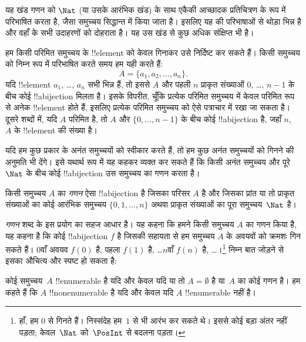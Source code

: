 \documentclass[../../../include/open-logic-section]{subfiles}
\begin{document}


\begin{editorial}
  यह खंड गणन को $\Nat$ (या उसके आरंभिक खंड) के साथ एकैकी आच्छादक
  प्रतिचित्रण के रूप में परिभाषित करता है, जैसा समुच्चय सिद्धान्त में किया
  जाता है। इसलिए यह  की परिभाषाओं से थोड़ा भिन्न है और वहाँ
  के सभी उदाहरणों को दोहराता है। यह उस खंड से कुछ अधिक संक्षिप्त भी है।
\end{editorial}

हम किसी परिमित समुच्चय के !!{element} को केवल गिनाकर उसे निर्दिष्ट कर सकते
हैं। किसी समुच्चय को निम्न रूप में परिभाषित करते समय हम यही करते हैं:
\[
  A = \{a_1, a_2, \ldots, a_n\}.
\]
यदि !!{element} $a_1$, \dots, $a_n$ सभी भिन्न हैं, तो इससे $A$ और पहली
$n$ प्राकृत संख्याओं $0$, \dots, $n-1$ के बीच कोई !!a{bijection} मिलता
है। इसके विपरीत, चूँकि प्रत्येक परिमित समुच्चय में केवल परिमित रूप से अनेक
!!{element} होते हैं, इसलिए प्रत्येक परिमित समुच्चय को ऐसे पत्राचार में रखा
जा सकता है। दूसरे शब्दों में, यदि $A$ परिमित है, तो $A$ और
$\{0, \dots, n-1\}$ के बीच कोई !!a{bijection} है, जहाँ $n$,~$A$ के
!!{element} की संख्या है।

यदि हम कुछ प्रकार के अनंत समुच्चयों को स्वीकार करते हैं, तो हम कुछ अनंत
समुच्चयों को गिनने की अनुमति भी देंगे। इसे यथार्थ रूप में यह कहकर व्यक्त कर
सकते हैं कि किसी अनंत समुच्चय और पूरे~$\Nat$ के बीच कोई !!a{bijection} उस
समुच्चय का गणन करता है।

\begin{defn}[गणन, समुच्चय-सैद्धान्तिक]
किसी समुच्चय $A$ का \emph{गणन} ऐसा !!a{bijection} है जिसका परिसर $A$ है और
जिसका प्रांत या तो प्राकृत संख्याओं का कोई आरंभिक समुच्चय $\{0,
1, \ldots, n\}$ {अथवा} प्राकृत संख्याओं का पूरा समुच्चय~$\Nat$ है।
\end{defn}

\begin{explain}
\emph{गणन} शब्द के इस प्रयोग का सहज आधार है। यह कहना कि हमने किसी समुच्चय
$A$ का गणन किया है, यह कहना है कि कोई !!a{bijection} $f$ है जिसकी सहायता से
हम समुच्चय $A$ के अवयवों को क्रमशः गिन सकते हैं। $0$वाँ अवयव $f(0)$ है,
पहला $f(1)$ है, \ldots $n$वाँ $f(n)$ है, \ldots{}।\footnote{हाँ,
हम $0$ से गिनते हैं। निस्संदेह हम~$1$ से भी आरंभ कर सकते थे। इससे कोई बड़ा
अंतर नहीं पड़ता; केवल~$\Nat$ को~$\PosInt$ से बदलना पड़ता।} निम्न बात जोड़ने
से इसका औचित्य और स्पष्ट हो सकता है:
\end{explain}

\begin{defn}
  कोई समुच्चय~$A$ !!{enumerable} है यदि और केवल यदि या तो
  $A = \emptyset$ है या~$A$ का कोई गणन है। हम कहते हैं कि $A$
  !!{nonenumerable} है यदि और केवल यदि $A$ !!{enumerable} नहीं है।
\end{defn}
\end{document}
